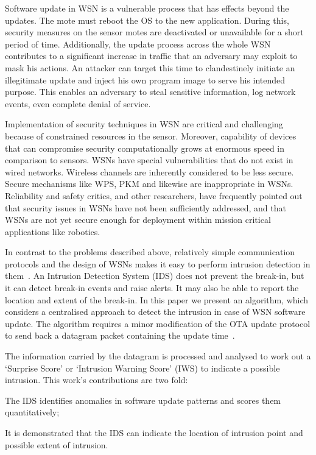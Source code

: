 \documentclass[conference,final]{IEEEtran}
\begin{document}
Software update in WSN is a vulnerable process that has
effects beyond the updates. 
The mote must reboot the OS to the new application.
During
this, security measures on the sensor motes are deactivated or
unavailable for a short period of time. Additionally, the update
process across the whole WSN contributes to a significant
increase in traffic that an adversary may exploit to mask his
actions. An attacker can target this time to clandestinely initiate
an illegitimate update and inject his own program image
to serve his intended purpose. This enables an adversary to
steal sensitive information, log network events, even complete
denial of service.

Implementation of security techniques in WSN are critical
and challenging because of constrained resources in the sensor.
Moreover, capability of devices that can compromise security
computationally grows at enormous speed in comparison to
sensors. 
%
WSNs have special vulnerabilities
that do not exist in wired networks. Wireless channels are
inherently considered to be less secure. Secure mechanisms
like WPS, PKM and likewise are inappropriate in WSNs.
Reliability and safety critics, and other researchers, have
frequently pointed out that security issues in WSNs have not
been sufficiently addressed, and that WSNs are not yet secure
enough for deployment within mission critical applications like
robotics.

In contrast to the problems described above, relatively
simple communication protocols and the design of WSNs
makes it easy to perform intrusion detection in them~\cite{quing09}.
An Intrusion Detection System (IDS) does not prevent the
break-in, but it can detect break-in events and raise alerts. It
may also be able to report the location and extent of the break-in. 
In this paper we present an algorithm, which considers a
centralised approach to detect the intrusion in case of WSN
software update. The algorithm requires a minor modification
of the OTA update protocol to send back a datagram packet
containing the update time~\cite{tep116}.

The information carried by the
datagram is processed and analysed to work out a `Surprise
Score' or `Intrusion Warning Score' (IWS) to indicate a
possible intrusion. 
This work's contributions are two fold: 
\begin{inparaenum}
\item  The IDS identifies anomalies in software update patterns
and scores them quantitatively;
\item It is demonstrated that the IDS
can indicate the location of intrusion point and possible extent
of intrusion.
\end{inparaenum}
\end{document}
